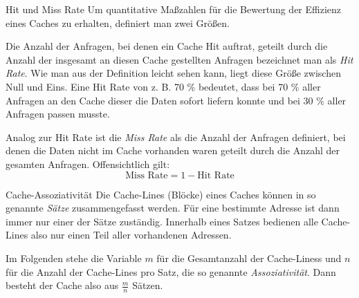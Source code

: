 \begin{defi}{Hit und Miss Rate}
    Um quantitative Maßzahlen für die Bewertung der Effizienz eines Caches zu erhalten, definiert man zwei Größen.

    Die Anzahl der Anfragen, bei denen ein Cache Hit auftrat, geteilt durch die Anzahl der insgesamt an diesen Cache gestellten Anfragen bezeichnet man als \emph{Hit Rate}.
    Wie man aus der Definition leicht sehen kann, liegt diese Größe zwischen Null und Eins. Eine Hit Rate von z. B. 70 \% bedeutet, dass bei 70 \% aller Anfragen an den Cache dieser die Daten sofort liefern konnte und bei 30 \% aller Anfragen passen musste.

    Analog zur Hit Rate ist die \emph{Miss Rate} als die Anzahl der Anfragen definiert, bei denen die Daten nicht im Cache vorhanden waren geteilt durch die Anzahl der gesamten Anfragen.
    Offensichtlich gilt:
    \[
        \text{Miss Rate} = 1 - \text{Hit Rate}
    \]
\end{defi}

\begin{defi}{Cache-Assoziativität}
    Die Cache-Lines (Blöcke) eines Caches können in so genannte \emph{Sätze} zusammengefasst werden.
    Für eine bestimmte Adresse ist dann immer nur einer der Sätze zuständig.
    Innerhalb eines Satzes bedienen alle Cache-Lines also nur einen Teil aller vorhandenen Adressen.

    Im Folgenden stehe die Variable $m$ für die Gesamtanzahl der Cache-Liness und $n$ für die Anzahl der Cache-Lines pro Satz, die so genannte \emph{Assoziativität}.
    Dann besteht der Cache also aus $\frac{m}{n}$ Sätzen.
\end{defi}

